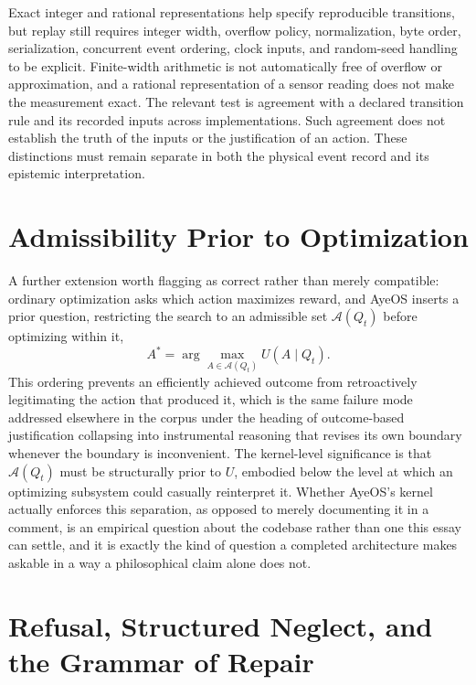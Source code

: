 \documentclass[11pt]{article}
\begin{document}
Exact integer and rational representations help specify reproducible transitions, but replay still requires integer width, overflow policy, normalization, byte order, serialization, concurrent event ordering, clock inputs, and random-seed handling to be explicit. Finite-width arithmetic is not automatically free of overflow or approximation, and a rational representation of a sensor reading does not make the measurement exact. The relevant test is agreement with a declared transition rule and its recorded inputs across implementations. Such agreement does not establish the truth of the inputs or the justification of an action. These distinctions must remain separate in both the physical event record and its epistemic interpretation.

\section{Admissibility Prior to Optimization}

A further extension worth flagging as correct rather than merely compatible: ordinary optimization asks which action maximizes reward, and AyeOS inserts a prior question, restricting the search to an admissible set $\mathcal{A}(Q_t)$ before optimizing within it,
\[
A^{*} = \arg\max_{A \in \mathcal{A}(Q_t)} U(A \mid Q_t).
\]
This ordering prevents an efficiently achieved outcome from retroactively legitimating the action that produced it, which is the same failure mode addressed elsewhere in the corpus under the heading of outcome-based justification collapsing into instrumental reasoning that revises its own boundary whenever the boundary is inconvenient. The kernel-level significance is that $\mathcal{A}(Q_t)$ must be structurally prior to $U$, embodied below the level at which an optimizing subsystem could casually reinterpret it. Whether AyeOS's kernel actually enforces this separation, as opposed to merely documenting it in a comment, is an empirical question about the codebase rather than one this essay can settle, and it is exactly the kind of question a completed architecture makes askable in a way a philosophical claim alone does not.

\section{Refusal, Structured Neglect, and the Grammar of Repair}
\end{document}
